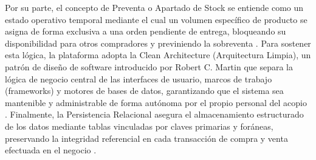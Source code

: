 Por su parte, el concepto de Preventa o Apartado de Stock se entiende como un estado operativo temporal mediante el cual un volumen específico de producto se asigna de forma exclusiva a una orden pendiente de entrega, bloqueando su disponibilidad para otros compradores y previniendo la sobreventa \parencite{villasmil2021}. Para sostener esta lógica, la plataforma adopta la Clean Architecture (Arquitectura Limpia), un patrón de diseño de software introducido por Robert C. Martin que separa la lógica de negocio central de las interfaces de usuario, marcos de trabajo (frameworks) y motores de bases de datos, garantizando que el sistema sea mantenible y administrable de forma autónoma por el propio personal del acopio \parencite{martin2018}. Finalmente, la Persistencia Relacional asegura el almacenamiento estructurado de los datos mediante tablas vinculadas por claves primarias y foráneas, preservando la integridad referencial en cada transacción de compra y venta efectuada en el negocio \parencite{elmasri2020}.
